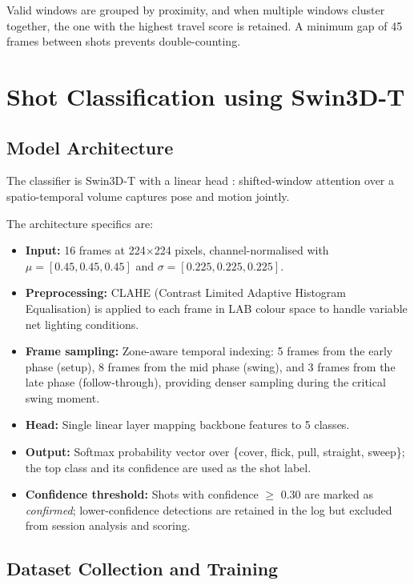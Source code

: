 \begin{justify}
\par Valid windows are grouped by proximity, and when multiple windows cluster together, the one with the highest travel score is retained. A minimum gap of 45 frames between shots prevents double-counting.

\section{Shot Classification using Swin3D-T}

\subsection{Model Architecture}

\par The classifier is Swin3D-T with a linear head \cite{Liu2022Swin3D}: shifted-window attention over a spatio-temporal volume captures pose and motion jointly.

\par The architecture specifics are:
\begin{itemize}
    \item \textbf{Input:} 16 frames at 224$\times$224 pixels, channel-normalised with $\mu = [0.45, 0.45, 0.45]$ and $\sigma = [0.225, 0.225, 0.225]$.
    \item \textbf{Preprocessing:} CLAHE (Contrast Limited Adaptive Histogram Equalisation) \cite{Zuiderveld1994CLAHE} is applied to each frame in LAB colour space to handle variable net lighting conditions.
    \item \textbf{Frame sampling:} Zone-aware temporal indexing: 5 frames from the early phase (setup), 8 frames from the mid phase (swing), and 3 frames from the late phase (follow-through), providing denser sampling during the critical swing moment.
    \item \textbf{Head:} Single linear layer mapping backbone features to 5 classes.
    \item \textbf{Output:} Softmax probability vector over \{cover, flick, pull, straight, sweep\}; the top class and its confidence are used as the shot label.
    \item \textbf{Confidence threshold:} Shots with confidence $\geq$ 0.30 are marked as \textit{confirmed}; lower-confidence detections are retained in the log but excluded from session analysis and scoring.
\end{itemize}

\subsection{Dataset Collection and Training}


\end{justify}
